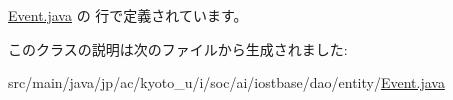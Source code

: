  \hyperlink{dao_2entity_2_event_8java_source}{Event.\-java} の  行で定義されています。



このクラスの説明は次のファイルから生成されました\-:\begin{DoxyCompactItemize}
\item 
src/main/java/jp/ac/kyoto\-\_\-u/i/soc/ai/iostbase/dao/entity/\hyperlink{dao_2entity_2_event_8java}{Event.\-java}\end{DoxyCompactItemize}
